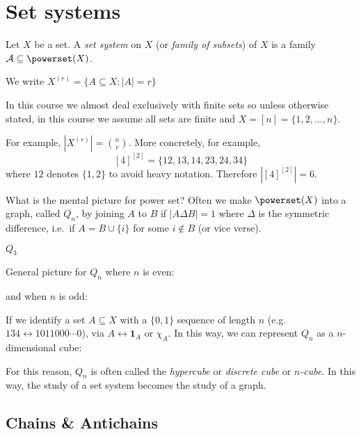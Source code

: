 \documentclass[a4paper]{article}
\begin{document}


\tableofcontents

\section{Set systems}

\begin{definition}
  Let \(X\) be a set. A \emph{set system} on \(X\) (or \emph{family of subsets}) of \(X\) is a family \(\mathcal A \subseteq \powerset (X)\).
\end{definition}

\begin{eg}
  We write \(X^{(r)} = \{A \subseteq X: |A| = r\}\)
\end{eg}

In this course we almost deal exclusively with finite sets so unless otherwise stated, in this course we assume all sets are finite and \(X = [n] = \{1, 2, \dots, n\}\).

For example, \(|X^{(r)}| = \binom{n}{r}\). More concretely, for example,
\[
  [4]^{[2]} = \{12, 13, 14, 23, 24, 34\}
\]
where \(12\) denotes \(\{1, 2\}\) to avoid heavy notation. Therefore \(|[4]^{[2]}| = 6\).

What is the mental picture for power set? Often we make \(\powerset (X)\) into a graph, called \(Q_n\), by joining \(A\) to \(B\) if \(|A \Delta B| = 1\) where \(\Delta\) is the symmetric difference, i.e.\ if \(A = B \cup \{i\}\) for some \(i \notin B\) (or vice verse).

\begin{eg}
  \(Q_3\)
\end{eg}

\begin{eg}
  General picture for \(Q_n\) where \(n\) is even:

  and when \(n\) is odd:
\end{eg}

If we identify a set \(A \subseteq X\) with a \(\{0, 1\}\) sequence of length \(n\) (e.g.\ \(134 \leftrightarrow 1011000 \cdots 0\)), via \(A \leftrightarrow \mathbf{1}_A \text{ or } \chi_A\). In this way, we can represent \(Q_n\) as a \(n\)-dimensional cube:

For this reason, \(Q_n\) is often called the \emph{hypercube} or \emph{discrete cube} or \emph{\(n\)-cube}. In this way, the study of a set system becomes the study of a graph.

\subsection{Chains \& Antichains}
\end{document}
